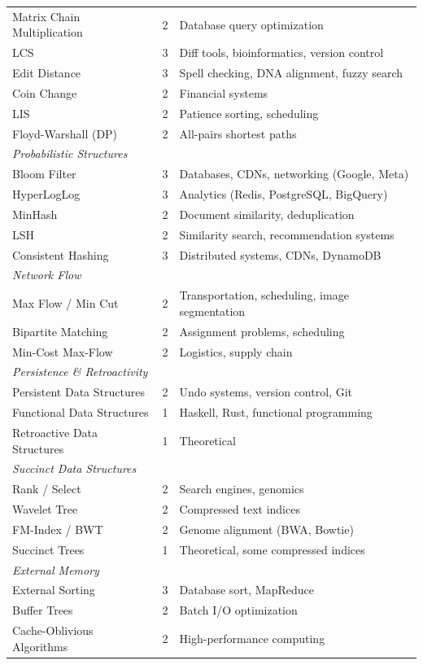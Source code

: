 \begin{center}
\begin{tabular}{lcl}
Matrix Chain Multiplication & 2 & Database query optimization \\
LCS & 3 & Diff tools, bioinformatics, version control \\
Edit Distance & 3 & Spell checking, DNA alignment, fuzzy search \\
Coin Change & 2 & Financial systems \\
LIS & 2 & Patience sorting, scheduling \\
Floyd-Warshall (DP) & 2 & All-pairs shortest paths \\
\midrule
\multicolumn{3}{l}{\textit{Probabilistic Structures}} \\
\midrule
Bloom Filter & 3 & Databases, CDNs, networking (Google, Meta) \\
HyperLogLog & 3 & Analytics (Redis, PostgreSQL, BigQuery) \\
MinHash & 2 & Document similarity, deduplication \\
LSH & 2 & Similarity search, recommendation systems \\
Consistent Hashing & 3 & Distributed systems, CDNs, DynamoDB \\
\midrule
\multicolumn{3}{l}{\textit{Network Flow}} \\
\midrule
Max Flow / Min Cut & 2 & Transportation, scheduling, image segmentation \\
Bipartite Matching & 2 & Assignment problems, scheduling \\
Min-Cost Max-Flow & 2 & Logistics, supply chain \\
\midrule
\multicolumn{3}{l}{\textit{Persistence \& Retroactivity}} \\
\midrule
Persistent Data Structures & 2 & Undo systems, version control, Git \\
Functional Data Structures & 1 & Haskell, Rust, functional programming \\
Retroactive Data Structures & 1 & Theoretical \\
\midrule
\multicolumn{3}{l}{\textit{Succinct Data Structures}} \\
\midrule
Rank / Select & 2 & Search engines, genomics \\
Wavelet Tree & 2 & Compressed text indices \\
FM-Index / BWT & 2 & Genome alignment (BWA, Bowtie) \\
Succinct Trees & 1 & Theoretical, some compressed indices \\
\midrule
\multicolumn{3}{l}{\textit{External Memory}} \\
\midrule
External Sorting & 3 & Database sort, MapReduce \\
Buffer Trees & 2 & Batch I/O optimization \\
Cache-Oblivious Algorithms & 2 & High-performance computing \\
\midrule
\bottomrule
\end{tabular}
\end{center}

